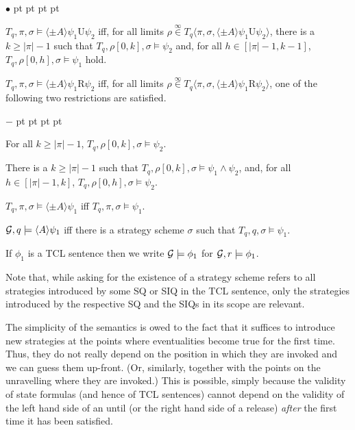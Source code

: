 \documentclass{llncs}
\newcommand{\calg}{{\cal G}}
\newcommand{\until}{\textrm{U}} %
\newcommand{\rmrel}{\textrm{R}} %
\newenvironment{list1}{\begin{list}{$\bullet$}
{\topsep 0 pt \parsep 0 pt \partopsep 0 pt \itemsep 0 pt}}{\end{list}}
\newenvironment{list2}{\begin{list}{$-$}
{\topsep 0 pt \parsep 0 pt \partopsep 0 pt \itemsep 0 pt}}{\end{list}}
\begin{document}
\begin{list1}
\item $T_q,\pi,\sigma \models \langle \pm A \rangle \psi_1\until\psi_2$ iff, for all limits 
    $\rho\stackrel{\infty}\in T_q\langle \pi,\sigma, \langle \pm A \rangle\psi_1\until\psi_2\rangle$, 
    there is a $k \geq |\pi|-1$ 
    such that $T_q,\rho[0,k],\sigma \models \psi_2$ and, 
    for all $h\in [|\pi|-1,k-1]$, 
    $T_q,\rho[0,h],\sigma\models \psi_1$ hold. 
\item $T_q,\pi,\sigma \models \langle \pm A \rangle \psi_1\rmrel\psi_2$ iff, 
    for all limits 
    $\rho\stackrel{\infty}\in T_q\langle\pi,\sigma,\langle \pm A \rangle\psi_1\rmrel\psi_2\rangle$, one of the following two restrictions 
    are satisfied. 
    \begin{list2} 
    \item For all $k \geq |\pi|-1$, $T_q,\rho[0,k],\sigma \models \psi_2$. 
    \item There is a $k\geq |\pi|-1$ such that 
      $T_q,\rho[0,k],\sigma\models \psi_1\wedge\psi_2$, and, 
      for all $h\in [|\pi|-1,k]$, $T_q,\rho[0,h],\sigma\models \psi_2$.
    \end{list2} 
\item $T_q,\pi,\sigma\models \langle \pm A \rangle \psi_1$ iff
    $T_q,\pi,\sigma \models \psi_1$.
\item $\calg, q \models \langle A \rangle \psi_1$ iff there is a strategy scheme $\sigma$ such that
    $T_q,q,\sigma \models \psi_1$.
\end{list1}

If $\phi_1$ is a TCL sentence %
then we write $\calg\models\phi_1$ for $\calg,r\models\phi_1$.


Note that, while asking for the existence of a strategy scheme refers to all strategies introduced by some SQ or SIQ in the TCL sentence, only the strategies introduced by the respective SQ and the SIQs in its scope are relevant.

The simplicity of the semantics is owed to the fact that 
it suffices to introduce new strategies at the points 
where eventualities become true for the first time.
Thus, they do not really depend on the position 
in which they are invoked and we can guess them up-front. 
(Or, similarly, together with the points on the unravelling 
where they are invoked.)
%
This is possible, simply because the validity of state formulas (and hence of TCL sentences) cannot depend on the validity of the left hand side of an until (or the right hand side of a release) \emph{after} the first time it has been satisfied. 
\end{document}
